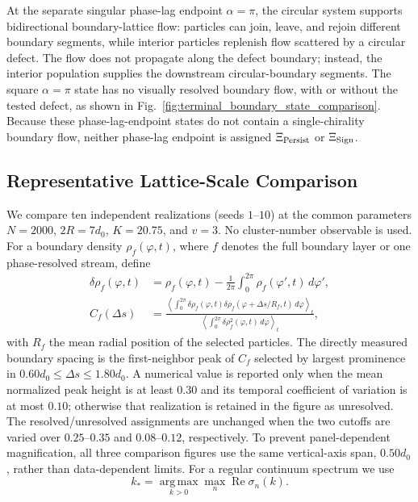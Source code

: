 \documentclass[11pt]{article}
\numberwithin{equation}{section}
\begin{document}
At the separate singular phase-lag endpoint $\alpha=\pi$, the circular system supports
bidirectional boundary-lattice flow: particles can join, leave, and rejoin
different boundary segments, while interior particles replenish flow scattered
by a circular defect.  The flow does not propagate along the defect boundary;
instead, the interior population supplies the downstream circular-boundary
segments.  The square $\alpha=\pi$ state has no visually resolved boundary flow, with or
without the tested defect, as shown in
Fig.~\ref{fig:terminal_boundary_state_comparison}.  Because these phase-lag-endpoint
states do not contain a single-chirality boundary flow, neither phase-lag endpoint is
assigned $\Xi_{\rm Persist}$ or $\Xi_{\rm Sign}$.

\subsection{Representative Lattice-Scale Comparison}

We compare ten independent realizations (seeds $1$--$10$) at the common
parameters $N=2000$, $2R=7d_0$, $K=20.75$, and $v=3$.  No cluster-number
observable is used.  For a boundary density $\rho_f(\varphi,t)$, where $f$
denotes the full boundary layer or one phase-resolved stream, define
\begin{align}
 \delta\rho_f(\varphi,t)
 &=\rho_f(\varphi,t)-\frac{1}{2\pi}
   \int_0^{2\pi}\rho_f(\varphi',t)\,d\varphi',\\
 C_f(\Delta s)
 &=\frac{\left\langle\int_0^{2\pi}
   \delta\rho_f(\varphi,t)
   \delta\rho_f(\varphi+\Delta s/R_f,t)\,d\varphi\right\rangle_t}
 {\left\langle\int_0^{2\pi}\delta\rho_f^2(\varphi,t)\,d\varphi\right\rangle_t},
 \label{eq:boundary_density_correlation}
\end{align}
with $R_f$ the mean radial position of the selected particles.  The directly
measured boundary spacing is the first-neighbor peak of $C_f$ selected by
largest prominence in $0.60d_0\leq\Delta s\leq1.80d_0$.  A numerical value is
reported only when the mean normalized peak height is at least $0.30$ and its
temporal coefficient of variation is at most $0.10$; otherwise that realization
is retained in the figure as unresolved.  The resolved/unresolved assignments
are unchanged when the two cutoffs are varied over $0.25$--$0.35$ and
$0.08$--$0.12$, respectively.  To prevent panel-dependent magnification, all
three comparison figures use the same vertical-axis span, $0.50d_0$, rather
than data-dependent limits.  For a regular continuum spectrum we use
\begin{equation}
  k_\ast=\underset{k>0}{\operatorname{arg\,max}}
  \max_n\operatorname{Re}\sigma_n(k) .
  \label{eq:lattice_scale_kstar}
\end{equation}
\end{document}
